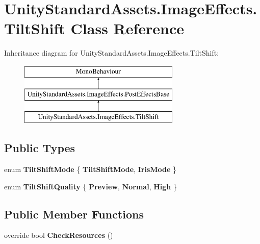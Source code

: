 \hypertarget{class_unity_standard_assets_1_1_image_effects_1_1_tilt_shift}{}\section{Unity\+Standard\+Assets.\+Image\+Effects.\+Tilt\+Shift Class Reference}
\label{class_unity_standard_assets_1_1_image_effects_1_1_tilt_shift}
Inheritance diagram for Unity\+Standard\+Assets.\+Image\+Effects.\+Tilt\+Shift\+:\begin{figure}[H]
\begin{center}
\leavevmode
\includegraphics[height=3.000000cm]{class_unity_standard_assets_1_1_image_effects_1_1_tilt_shift}
\end{center}
\end{figure}
\subsection*{Public Types}
\begin{DoxyCompactItemize}
\item 
enum {\bfseries Tilt\+Shift\+Mode} \{ {\bfseries Tilt\+Shift\+Mode}, 
{\bfseries Iris\+Mode}
 \}\hypertarget{class_unity_standard_assets_1_1_image_effects_1_1_tilt_shift_a30526c23a7fabb0f3b6e86e669fbeaae}{}\label{class_unity_standard_assets_1_1_image_effects_1_1_tilt_shift_a30526c23a7fabb0f3b6e86e669fbeaae}

\item 
enum {\bfseries Tilt\+Shift\+Quality} \{ {\bfseries Preview}, 
{\bfseries Normal}, 
{\bfseries High}
 \}\hypertarget{class_unity_standard_assets_1_1_image_effects_1_1_tilt_shift_a25a7f26cb8470a26a167c6d381489605}{}\label{class_unity_standard_assets_1_1_image_effects_1_1_tilt_shift_a25a7f26cb8470a26a167c6d381489605}

\end{DoxyCompactItemize}
\subsection*{Public Member Functions}
\begin{DoxyCompactItemize}
\item 
override bool {\bfseries Check\+Resources} ()\hypertarget{class_unity_standard_assets_1_1_image_effects_1_1_tilt_shift_a6104d3359c6ded06aa89fba59ecf404e}{}\label{class_unity_standard_assets_1_1_image_effects_1_1_tilt_shift_a6104d3359c6ded06aa89fba59ecf404e}

\end{DoxyCompactItemize}
